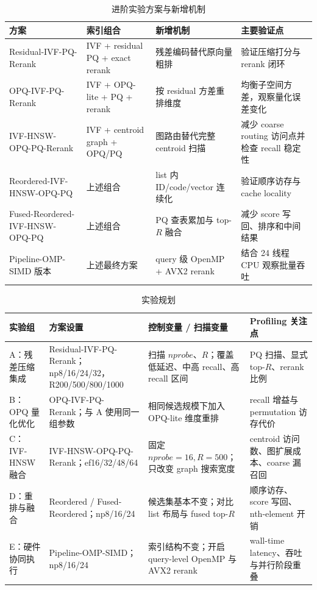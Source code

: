 \documentclass[a4paper]{article}
\begin{document}
\begin{table}[H]
\centering
\scriptsize
\caption{进阶实验方案与新增机制}
\label{tab:advanced-schemes}
\setlength{\tabcolsep}{4pt}
\renewcommand{\arraystretch}{1.12}
\begin{tabularx}{\textwidth}{>{\raggedright\arraybackslash}p{}>{\raggedright\arraybackslash}p{}>{\raggedright\arraybackslash}p{}>{\raggedright\arraybackslash}X}
\toprule
方案 & 索引组合 & 新增机制 & 主要验证点  \\
\midrule
Residual-IVF-PQ-Rerank & IVF + residual PQ + exact rerank & 残差编码替代原向量粗排 & 验证压缩打分与 rerank 闭环 \\
OPQ-IVF-PQ-Rerank & IVF + OPQ-lite + PQ + rerank & 按 residual 方差重排维度 & 均衡子空间方差，观察量化误差变化 \\
IVF-HNSW-OPQ-PQ-Rerank & IVF + centroid graph + OPQ/PQ & 图路由替代完整 centroid 扫描 & 减少 coarse routing 访问点并检查 recall 稳定性 \\
Reordered-IVF-HNSW-OPQ-PQ & 上述组合 & list 内 ID/code/vector 连续化 & 验证顺序访存与 cache locality \\
Fused-Reordered-IVF-HNSW-OPQ-PQ & 上述组合 & PQ 查表累加与 top-$R$ 融合 & 减少 score 写回、排序和中间结果 \\
Pipeline-OMP-SIMD 版本 & 上述最终方案 & query 级 OpenMP + AVX2 rerank & 结合 24 线程 CPU 观察批量吞吐 \\
\bottomrule
\end{tabularx}
\end{table}


\begin{table}[H]
\centering
\scriptsize
\caption{实验规划}
\label{tab:advanced-plan}
\setlength{\tabcolsep}{4pt}
\renewcommand{\arraystretch}{1.12}
\begin{tabularx}{\textwidth}{>{\raggedright\arraybackslash}p{}>{\raggedright\arraybackslash}p{}>{\raggedright\arraybackslash}p{}>{\raggedright\arraybackslash}X}
\toprule
实验组 & 方案设置 & 控制变量 / 扫描变量 & Profiling 关注点 \\
\midrule
A：残差压缩集成 & Residual-IVF-PQ-Rerank；np8/16/24/32，R200/500/800/1000 & 扫描 $nprobe$、$R$；覆盖低延迟、中高 recall、高 recall 区间 & PQ 扫描、显式 top-$R$、rerank 比例 \\
B：OPQ 量化优化 & OPQ-IVF-PQ-Rerank；与 A 使用同一组参数 & 相同候选规模下加入 OPQ-lite 维度重排 & recall 增益与 permutation 访存代价 \\
C：IVF-HNSW 融合 & IVF-HNSW-OPQ-PQ-Rerank；ef16/32/48/64 & 固定 $nprobe=16,R=500$；只改变 graph 搜索宽度 & centroid 访问数、图扩展成本、coarse 漏召回 \\
D：重排与融合 & Reordered / Fused-Reordered；np8/16/24 & 候选集基本不变；对比 list 布局与 fused top-$R$ & 顺序访存、score 写回、nth-element 开销 \\
E：硬件协同执行 & Pipeline-OMP-SIMD；np8/16/24 & 索引结构不变；开启 query-level OpenMP 与 AVX2 rerank & wall-time latency、吞吐与并行阶段重叠 \\
\bottomrule
\end{tabularx}
\end{table}
\end{document}
